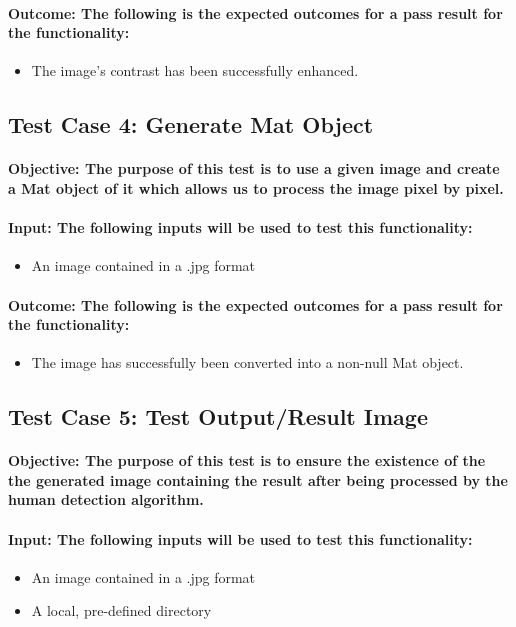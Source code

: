 \documentclass[a4paper,12pt]{report}
\begin{document}
	\paragraph{Outcome: The following is the expected outcomes for a pass result for the functionality:}
	\begin{itemize}
		\item The image's contrast has been successfully enhanced.
	\end{itemize}
		
	\subsection{Test Case 4: Generate Mat Object}
	\paragraph{Objective: The purpose of this test is to use a given image and create a Mat object of it which allows us to process the image pixel by pixel.}
	\paragraph{Input: The following inputs will be used to test this functionality:}
	\begin{itemize}
		\item An image contained in a .jpg format
	\end{itemize}
	\paragraph{Outcome: The following is the expected outcomes for a pass result for the functionality:}
	\begin{itemize}
		\item The image has successfully been converted into a non-null Mat object.
	\end{itemize}	
	
	\subsection{Test Case 5: Test Output/Result Image}
	\paragraph{Objective: The purpose of this test is to ensure the existence of the the generated image containing the result after being processed by the human detection algorithm.}
	\paragraph{Input: The following inputs will be used to test this functionality:}
	\begin{itemize}
		\item An image contained in a .jpg format
		\item A local, pre-defined directory
	\end{itemize}
\end{document}
